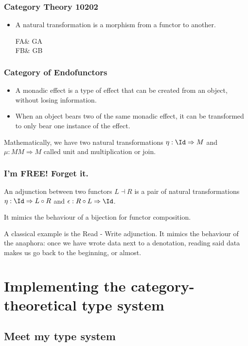 \documentclass[math, english, info]{beamercours}
\begin{document}
\begin{frame}[fragile]
	\frametitle{Category Theory 10202}
	\begin{itemize}
		\item A natural transformation is a morphism from a functor to another.
		      \pause
		      \begin{category}
			      FA\ar[r, "\theta_{A}"]\ar[d, "F\phi"'] & GA\ar[d, "G\phi"]\\
			      FB\ar[r, "\theta_{B}"'] & GB
		      \end{category}
	\end{itemize}
\end{frame}

\begin{frame}[fragile]
	\frametitle{Category of Endofunctors}
	\begin{itemize}
		\item A monadic effect is a type of effect that can be created from an
		      object, without losing information.
		\item When an object bears two of the same monadic effect, it can be
		      transformed to only bear one instance of the effect.
	\end{itemize}
	\pause

	Mathematically, we have two natural transformations $\eta: \Id \Rightarrow M$
	and $\mu: MM \Rightarrow M$ called unit and multiplication or join.
\end{frame}

\begin{frame}[fragile]
	\frametitle{I'm FREE! Forget it.}
	An adjunction between two functors $L \dashv R$ is a pair of natural
	transformations $\eta: \Id \Rightarrow L \circ R$ and $\epsilon: R \circ L
		\Rightarrow \Id$.

	\smallskip

	It mimics the behaviour of a bijection for functor composition.

	\pause

	A classical example is the Read - Write adjunction.
	It mimics the behaviour of the anaphora: once we have wrote data next to a
	denotation, reading said data makes us go back to the beginning, or almost.
\end{frame}

\section{Implementing the category-theoretical type system}
\subsection{Meet my type system}
\end{document}
